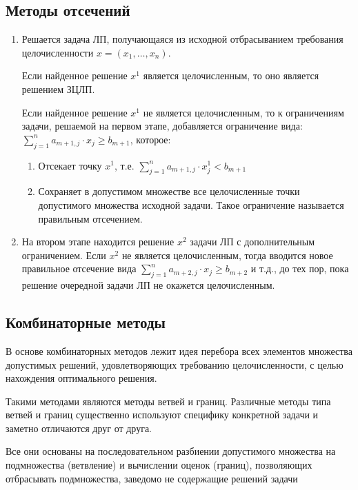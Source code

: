 \documentclass[17pt]{extarticle}
\begin{document}
\subsection{Методы отсечений}
\begin{enumerate}
    \item Решается задача ЛП, получающаяся из исходной отбрасыванием требования целочисленности \( x = (x_1, \ldots, x_n) \).

          Если найденное решение \( x^1 \) является целочисленным, то оно является решением ЗЦЛП.

          Если найденное решение \( x^1 \) не является целочисленным, то к ограничениям задачи, решаемой на первом этапе, добавляется ограничение вида:
          \(
          \sum_{j=1}^n a_{m+1,j} \cdot x_j \geq b_{m+1}
          \), которое:

          \begin{enumerate}
              \item Отсекает точку \( x^1 \), т.е. \(\sum_{j=1}^n a_{m+1,j} \cdot x_j^1 < b_{m+1}\)
              \item Сохраняет в допустимом множестве все целочисленные точки допустимого множества исходной задачи.
                    Такое ограничение называется правильным отсечением.
          \end{enumerate}

    \item На втором этапе находится решение \( x^2 \) задачи ЛП с дополнительным ограничением.
          Если \( x^2 \) не является целочисленным,
          тогда вводится новое правильное отсечение вида \(\sum_{j=1}^n a_{m+2,j} \cdot x_j \geq b_{m+2}\)
          и т.д., до тех пор, пока решение очередной задачи ЛП не окажется целочисленным.
\end{enumerate}

\subsection{Комбинаторные методы}
В основе комбинаторных методов лежит идея
перебора всех элементов множества допустимых
решений, удовлетворяющих требованию
целочисленности, с целью нахождения
оптимального решения.

Такими методами являются методы ветвей и границ.
Различные методы типа ветвей и границ существенно
используют специфику конкретной задачи и заметно
отличаются друг от друга.

Все они основаны на последовательном разбиении
допустимого множества на подмножества (ветвление) и
вычислении оценок (границ), позволяющих отбрасывать
подмножества, заведомо не содержащие решений задачи
\end{document}
